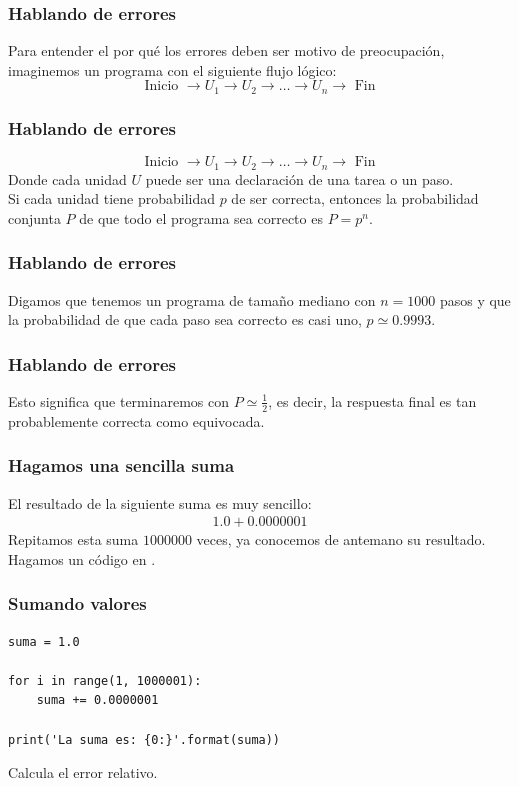 \documentclass[12pt]{beamer}
\begin{document}
\begin{frame}
\frametitle{Hablando de errores}
Para entender el por qué los errores deben ser motivo de preocupación, imaginemos un programa con el siguiente flujo lógico:
\pause
\begin{equation}
\text{Inicio } \rightarrow U_{1} \rightarrow U_{2} \rightarrow \ldots \rightarrow U_{n} \rightarrow \text{ Fin} 
\label{eq:ecuacion_02_01}
\end{equation}
\end{frame}
\begin{frame}
\frametitle{Hablando de errores}
\begin{equation*}
\text{Inicio } \rightarrow U_{1} \rightarrow U_{2} \rightarrow \ldots \rightarrow U_{n} \rightarrow \text{ Fin} 
\end{equation*}
Donde cada unidad $U$ puede ser una declaración de una tarea o un paso.
\\
\bigskip
\pause
Si cada unidad tiene probabilidad $p$ de ser correcta, entonces la probabilidad conjunta $P$ de que todo el programa sea correcto es $P = p^{n}$.
\\
\end{frame}
\begin{frame}
\frametitle{Hablando de errores}
Digamos que tenemos un programa de tamaño mediano con $n = 1000$ pasos y que la probabilidad de que cada paso sea correcto es casi uno, $p \simeq 0.9993$.
\end{frame}
\begin{frame}
\frametitle{Hablando de errores}
Esto significa que terminaremos con $P \simeq \frac{1}{2}$, es decir, la respuesta final es tan probablemente correcta como equivocada.
\end{frame}
\begin{frame}
\frametitle{Hagamos una sencilla suma}
El resultado de la siguiente suma es muy sencillo:
\pause
\begin{align*}
1.0 + 0.0000001
\end{align*}
\pause
Repitamos esta suma $1000000$ veces, ya conocemos de antemano su resultado. \pause Hagamos un código en \python.
\end{frame}
\begin{frame}[fragile]
\frametitle{Sumando valores}
\begin{lstlisting}[caption=Sumando en un ciclo]
suma = 1.0

for i in range(1, 1000001):
    suma += 0.0000001

print('La suma es: {0:}'.format(suma))
\end{lstlisting}
Calcula el error relativo.
\end{frame}
\end{document}
